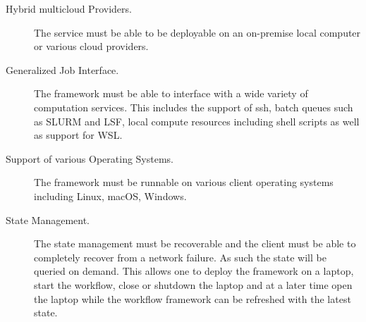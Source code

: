 \begin{description}
\item[Hybrid multicloud Providers.] The service must be able to be deployable on an on-premise local computer or various cloud providers.

\item[Generalized Job Interface.] The framework must be able to interface 
with a wide variety of computation services. This includes the support
of ssh, batch queues such as SLURM and LSF, local compute resources
including shell scripts as well as support for WSL.

\item[Support of various Operating Systems.] The framework must be runnable on various client operating systems including Linux, macOS, Windows.

\item[State Management.] The state management must be recoverable and the client must be able to completely recover from a network failure. As such the state will be queried on demand. This allows one to deploy the framework on a laptop, start the workflow, close or shutdown the laptop and at a later time open the laptop while the workflow framework can be refreshed with the latest state.

\end{description}
